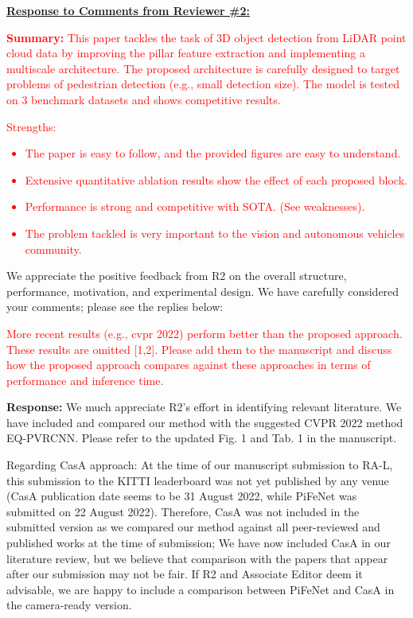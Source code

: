 \documentclass[11pt]{article}
\begin{document}
\vspace{20pt}
\underline{\textbf{Response to Comments from Reviewer \#2:}}

\textcolor{red}{\textbf{Summary:} This paper tackles the task of 3D object detection from LiDAR point cloud data by improving the pillar feature extraction and implementing
a multiscale architecture. The proposed architecture is carefully
designed to target problems of pedestrian detection (e.g., small
detection size). The model is tested on 3 benchmark datasets and shows
competitive results.}

\textcolor{red}{Strengths:
\begin{itemize} \vspace{-1em} \setlength\itemsep{-0.2em}
    \item The paper is easy to follow, and the provided figures are easy to
understand.
    \item Extensive quantitative ablation results show the effect of each
proposed block.
    \item Performance is strong and competitive with SOTA. (See weaknesses).
    \item The problem tackled is very important to the vision and autonomous
vehicles community.
\end{itemize}
}

We appreciate the positive feedback from R2 on the overall structure, performance, motivation, and experimental design. We have carefully considered your comments; please see the replies below:

\textcolor{red}{More recent results (e.g., cvpr 2022) perform better than the
proposed approach. These results are omitted [1,2]. Please add them to
the manuscript and discuss how the proposed approach compares against
these approaches in terms of performance and inference time.} 

\textbf{Response: } We much appreciate R2's effort in identifying relevant literature. 
We have included and compared our method with the suggested CVPR 2022 method EQ-PVRCNN\cite{EQPVRCNN}. Please refer to the updated Fig. 1 and Tab. 1 in the manuscript. 

Regarding CasA\cite{wu2022casa} approach: At the time of our manuscript submission to RA-L, this submission to the KITTI leaderboard was not yet published by any venue (CasA publication date seems to be 31 August 2022, while PiFeNet was submitted on 22 August 2022). Therefore, CasA was not included in the submitted version as we compared our method against all peer-reviewed and published works at the time of submission; We have now included CasA in our literature review, but we believe that comparison with the papers that appear after our submission may not be fair. If R2 and Associate Editor deem it advisable, we are happy to include a comparison between PiFeNet and CasA in the camera-ready version. 
\end{document}
